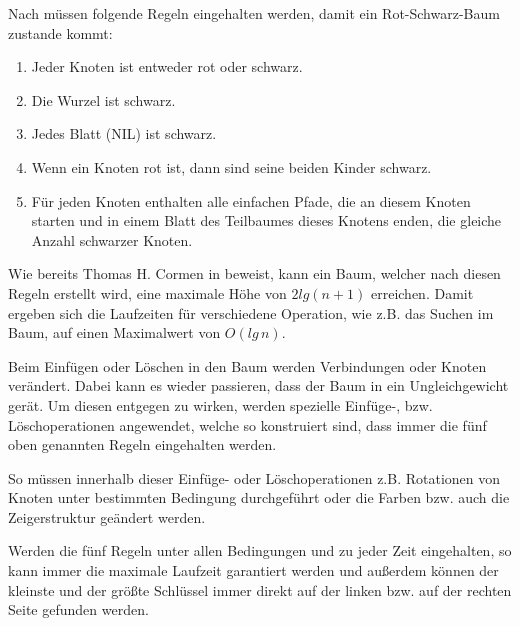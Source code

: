  
Nach \cite{tcormen} müssen folgende Regeln eingehalten werden, damit ein Rot-Schwarz-Baum zustande kommt:

\begin{enumerate}
	\item Jeder Knoten ist entweder rot oder schwarz.
	\item Die Wurzel ist schwarz.
	\item Jedes Blatt (NIL) ist schwarz.
	\item Wenn ein Knoten rot ist, dann sind seine beiden Kinder schwarz.
	\item Für jeden Knoten enthalten alle einfachen Pfade, die an diesem Knoten starten und in einem Blatt des Teilbaumes dieses Knotens enden, die gleiche Anzahl schwarzer Knoten. 
\end{enumerate}

Wie bereits Thomas H. Cormen in \cite{tcormen} beweist, kann ein Baum, welcher nach diesen Regeln erstellt wird, eine maximale Höhe von $2lg(n+1)$ erreichen. Damit ergeben sich die Laufzeiten für verschiedene Operation, wie z.B. das Suchen im Baum, auf einen Maximalwert von $O(lg\, n)$.

Beim Einfügen oder Löschen in den Baum werden Verbindungen oder Knoten verändert. Dabei kann es wieder passieren, dass der Baum in ein Ungleichgewicht gerät. 
Um diesen entgegen zu wirken, werden spezielle Einfüge-, bzw. Lösch\-operationen angewendet, welche so konstruiert sind, dass immer die fünf oben genannten Regeln eingehalten werden. 

So müssen innerhalb dieser Einfüge- oder Löschoperation\-en z.B. Rotationen von Knoten unter bestimmten Bedingung durchgeführt oder die Farben bzw. auch die Zeigerstruktur geändert werden.

Werden die fünf Regeln unter allen Bedingungen und zu jeder Zeit eingehalten, so kann immer die maximale Laufzeit garantiert werden und außerdem können der kleinste und der größte Schlüssel immer direkt auf der linken bzw. auf der rechten Seite gefunden werden.

